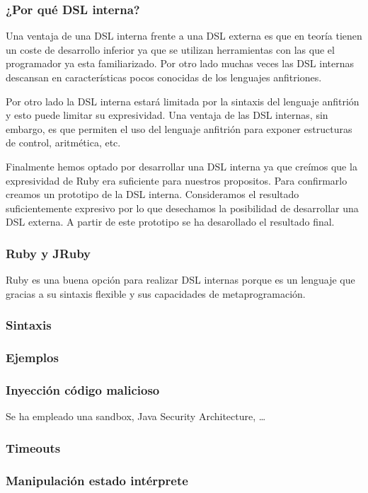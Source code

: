 \subsubsection{¿Por qué DSL interna?}

Una ventaja de una DSL interna frente a una DSL externa es que en
teoría tienen un coste de desarrollo inferior ya que se utilizan
herramientas con las que el programador ya esta familiarizado. Por
otro lado muchas veces las DSL internas descansan en características
pocos conocidas de los lenguajes anfitriones.

Por otro lado la DSL interna estará limitada por la sintaxis del
lenguaje anfitrión y esto puede limitar su expresividad. Una ventaja
de las DSL internas, sin embargo, es que permiten el uso del lenguaje
anfitrión para exponer estructuras de control, aritmética, etc.

Finalmente hemos optado por desarrollar una DSL interna ya que creímos
que la expresividad de Ruby era suficiente para nuestros
propositos. Para confirmarlo creamos un prototipo de la DSL
interna. Consideramos el resultado suficientemente expresivo por lo
que desechamos la posibilidad de desarrollar una DSL externa. A partir
de este prototipo se ha desarollado el resultado final.

\subsubsection{Ruby y JRuby}
Ruby es una buena opción para realizar DSL internas porque es un
lenguaje que gracias a su sintaxis flexible y sus capacidades de
metaprogramación.
\subsubsection{Sintaxis}
\subsubsection{Ejemplos}

\subsubsection{Inyección código malicioso}
Se ha empleado una sandbox, Java Security Architecture, \ldots{}
\subsubsection{Timeouts}
\subsubsection{Manipulación estado intérprete}
\label{interpreter_state_manipulation}

